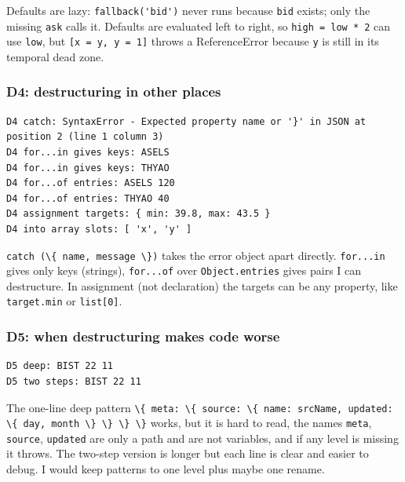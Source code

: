 \documentclass[
  11pt,
]{article}
\newcommand{\passthrough}[1]{#1}
\begin{document}
Defaults are lazy: \passthrough{\lstinline!fallback('bid')!} never runs
because \passthrough{\lstinline!bid!} exists; only the missing
\passthrough{\lstinline!ask!} calls it. Defaults are evaluated left to
right, so \passthrough{\lstinline!high = low * 2!} can use
\passthrough{\lstinline!low!}, but
\passthrough{\lstinline![x = y, y = 1]!} throws a ReferenceError because
\passthrough{\lstinline!y!} is still in its temporal dead zone.

\subsubsection{D4: destructuring in other
places}\label{d4-destructuring-in-other-places}

\begin{lstlisting}
D4 catch: SyntaxError - Expected property name or '}' in JSON at position 2 (line 1 column 3)
D4 for...in gives keys: ASELS
D4 for...in gives keys: THYAO
D4 for...of entries: ASELS 120
D4 for...of entries: THYAO 40
D4 assignment targets: { min: 39.8, max: 43.5 }
D4 into array slots: [ 'x', 'y' ]
\end{lstlisting}

\passthrough{\lstinline!catch (\{ name, message \})!} takes the error
object apart directly. \passthrough{\lstinline!for...in!} gives only
keys (strings), \passthrough{\lstinline!for...of!} over
\passthrough{\lstinline!Object.entries!} gives pairs I can destructure.
In assignment (not declaration) the targets can be any property, like
\passthrough{\lstinline!target.min!} or
\passthrough{\lstinline!list[0]!}.

\subsubsection{D5: when destructuring makes code
worse}\label{d5-when-destructuring-makes-code-worse}

\begin{lstlisting}
D5 deep: BIST 22 11
D5 two steps: BIST 22 11
\end{lstlisting}

The one-line deep pattern
\passthrough{\lstinline!\{ meta: \{ source: \{ name: srcName, updated: \{ day, month \} \} \} \}!}
works, but it is hard to read, the names \passthrough{\lstinline!meta!},
\passthrough{\lstinline!source!}, \passthrough{\lstinline!updated!} are
only a path and are not variables, and if any level is missing it
throws. The two-step version is longer but each line is clear and easier
to debug. I would keep patterns to one level plus maybe one rename.
\end{document}

